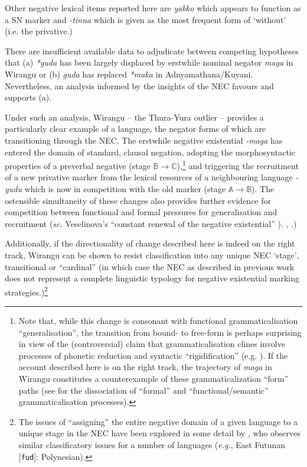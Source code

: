 {{	Other negative lexical items reported here are \textit{yakko} which appears to function as a SN marker and \textit{-tinna} which is given as the most frequent form of `without' (i.e. the privative.)}

 There are insufficient available data to adjudicate between competing hypotheses that (a) \textit{*guda} has been largely displaced by erstwhile nominal negator \textit{maga} in Wirangu or (b) \textit{guda} has replaced \textit{*maka} in Adnyamathana/Kuyani. Nevertheless, an analysis informed by the insights of the \acrshort{NEC} favours and supports (a).
 
Under such an analysis, Wirangu -- the Thura-Yura outlier -- provides a particularly clear example of a language, the negator forms of which are transitioning through the NEC. The erstwhile negative existential \textit{-maga} has entered the domain of standard, clausal negation, adopting the morphosyntactic properties of a preverbal negative (stage $\mathbb{B\to C}$),\footnote{Note that, while this change is consonant with functional grammaticalisation ``generalisation'', the transition from bound- to free-form is perhaps surprising in view of the (controversial) claim that grammaticalisation clines involve processes of phonetic reduction and syntactic ``rigidification'' (e.g. \citealp{Geurts2000}). If the account described here is on the right track, the trajectory of \textit{maga} in Wirangu constitutes a counterexample of these grammaticalization ``form'' paths (see \citealp[40]{vanderAuwera2008,Ahern} for the dissociation of ``formal'' and ``functional/semantic'' grammaticalisation processes).} and triggering the recruitment of a new privative marker from the lexical resources of a neighbouring language \textit{-yudu} which is now in competition with the old marker (stage $\mathbb{A\to B}$). The ostensible simultaneity of these changes also provides further evidence for competition between functional and formal pressures for generalisation and recruitment (\textit{sc.} Veselinova's ``constant renewal of the negative existential'' \citeyearpar[173]{Veselinova2016}).
\citealt[225]{Miestamo2005}, \citealt{Phillips2021b}.)%

Additionally, if the directionality of change described here is indeed on the right track, Wirangu can be shown to resist classification into any unique \acrshort{NEC} `stage', transitional or ``cardinal'' (in which case the \acrshort{NEC} as described in previous work does not represent a complete linguistic typology for negative existential marking strategies.)\footnote{The issues of ``assigning'' the entire negative domain of a given language to a unique stage in the \acrshort{NEC} have been explored in some detail by \citep{Veselinova2016}, who observes similar classificatory issues for a number of languages (\textit{e.g.}, East Futunan [\texttt{fud}]: Polynesian).}










}
